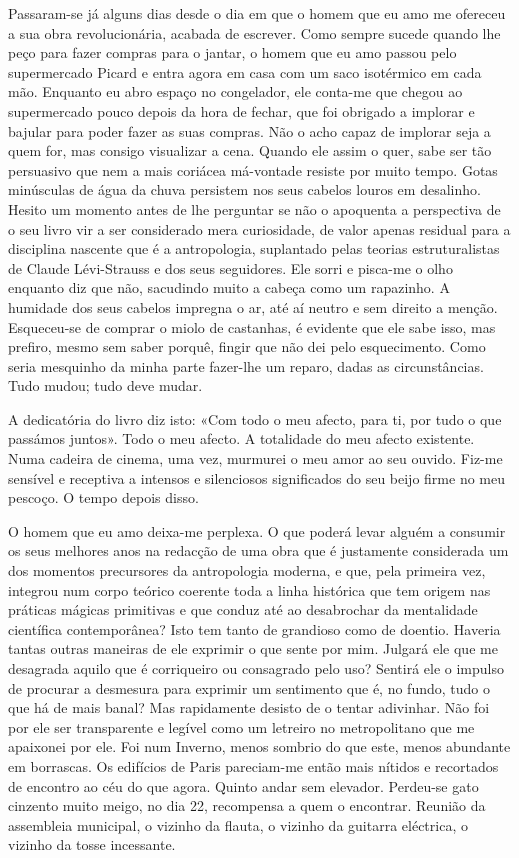 Passaram-se já alguns dias desde o dia em que o homem que eu amo me
ofereceu a sua obra revolucionária, acabada de escrever. Como sempre
sucede quando lhe peço para fazer compras para o jantar, o homem que eu
amo passou pelo supermercado Picard e entra agora em casa com um saco
isotérmico em cada mão. Enquanto eu abro espaço no congelador, ele
conta-me que chegou ao supermercado pouco depois da hora de fechar, que
foi obrigado a implorar e bajular para poder fazer as suas compras. Não
o acho capaz de implorar seja a quem for, mas consigo visualizar a cena.
Quando ele assim o quer, sabe ser tão persuasivo que nem a mais coriácea má-vontade resiste por muito tempo. Gotas minúsculas de água da
chuva persistem nos seus cabelos louros em desalinho. Hesito um momento
antes de lhe perguntar se não o apoquenta a perspectiva de o seu livro
vir a ser considerado mera curiosidade, de valor apenas residual para a
disciplina nascente que é a antropologia, suplantado pelas teorias
estruturalistas de Claude Lévi-Strauss e dos seus seguidores. Ele sorri
e pisca-me o olho enquanto diz que não, sacudindo muito a cabeça como um
rapazinho. A humidade dos seus cabelos impregna o ar, até aí neutro e
sem direito a menção. Esqueceu-se de comprar o miolo de castanhas, é
evidente que ele sabe isso, mas prefiro, mesmo sem saber porquê, fingir
que não dei pelo esquecimento. Como seria mesquinho da minha parte
fazer-lhe um reparo, dadas as circunstâncias. Tudo mudou; tudo deve mudar.

A dedicatória do livro diz isto: «Com todo o meu afecto, para ti, por
tudo o que passámos juntos». Todo o meu afecto.
A totalidade do meu afecto existente. Numa cadeira de cinema, uma vez,
murmurei o meu amor ao seu ouvido. Fiz-me sensível e receptiva a
intensos e silenciosos significados do seu beijo firme no meu pescoço. O
tempo depois disso.

O homem que eu amo deixa-me perplexa. O que poderá levar alguém a
consumir os seus melhores anos na redacção de uma obra que é justamente
considerada um dos momentos precursores da antropologia moderna, e que,
pela primeira vez, integrou num corpo teórico coerente toda a linha
histórica que tem origem nas práticas mágicas primitivas e que conduz
até ao desabrochar da mentalidade científica contemporânea? Isto tem
tanto de grandioso como de doentio. Haveria tantas outras maneiras de
ele exprimir o que sente por mim. Julgará ele que me desagrada aquilo
que é corriqueiro ou consagrado pelo uso? Sentirá ele o impulso de
procurar a desmesura para exprimir um sentimento que é, no fundo, tudo o
que há de mais banal? Mas rapidamente desisto de o tentar adivinhar. Não
foi por ele ser transparente e legível como um letreiro no metropolitano
que me apaixonei por ele. Foi num Inverno, menos sombrio do que este,
menos abundante em borrascas. Os edifícios de Paris pareciam-me então
mais nítidos e recortados de encontro ao céu do que agora. Quinto andar
sem elevador. Perdeu-se gato cinzento muito meigo, no dia 22, recompensa
a quem o encontrar. Reunião da assembleia municipal, o vizinho da
flauta, o vizinho da guitarra eléctrica, o vizinho da tosse incessante.

